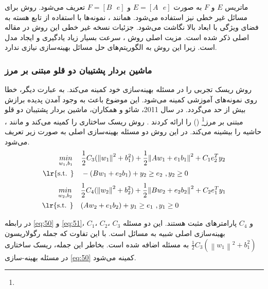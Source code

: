 ماتریس  $E$ و $F$  به صورت  $E=[A\text{ }e]$ و $F=[B\text{ }e]$ تعریف می‌شود.  روش  برای مسائل غیر خطی نیز استفاده می‌شود. همانند ، نمونه‌ها با استفاده از تابع هسته به فضای ویژگی با ابعاد بالا نگاشت می‌شود. جزئیات نسخه غیر خطی این روش در مقاله اصلی \cite{kumar2009} ذکر شده است. مزیت اصلی روش ، سرعت بسیار زیاد یادگیری و ایجاد مدل است. زیرا این روش به الگوریتم‌های حل مسائل بهینه‌سازی نیازی ندارد.

\subsubsection{ماشین بردار پشتیبان دو قلو مبتنی بر مرز}\label{sec:2:2:3:2}
روش  ریسک تجربی را در مسئله بهینه‌سازی خود کمینه می‌کند. به عبارت دیگر، خطا روی نمونه‌های آموزشی کمینه می‌شود. این موضوع باعث به وجود آمدن پدیده برازش بیش از حد می‌گردد. در سال 2011، شائو و همکاران، ماشین بردار پشتیبان دو قلو مبتنی بر مرز\footnote{}  () را ارائه کردند \cite{shao2011}. روش  ریسک ساختاری را کمینه می‌کند و مانند ، حاشیه را بیشینه می‌کند. در این روش دو مسئله بهینه‌سازی اصلی به صورت زیر تعریف می‌شود.
\begin{equation}
\begin{split}
   \underset{{{w}_{1}},{{b}_{1}}}{\mathop{min}}\,\quad  & \frac{1 }{2} C_{3} (\left\|w_{1}\right\|^{2}+b^{2}_{1}) + \frac{1}{2}{{\left\| A{{w}_{1}}+{{e}_{1}}{{b}_{1}} \right\|}^{2}}+{{C}_{1}}e_{2}^{T}{{y}_{2}}  \\
\textrm{\lr{s.t. }} \quad  & -(B{{w}_{1}}+{{e}_{2}}{{b}_{1}})+{{y}_{2}}\ge {{e}_{2}}\text{ },{{y}_{2}}\ge 0  \\
\end{split}
\label{eq:50}
\end{equation}
\begin{equation}
\begin{split}
\underset{{{w}_{2}},{{b}_{2}}}{\mathop{min}}\,\quad  & \frac{1 }{2} C_{4} (\left\|w_{2}\right\|^{2}+b^{2}_{2}) + \frac{1}{2}{{\left\| B{{w}_{2}}+{{e}_{2}}{{b}_{2}} \right\|}^{2}}+{{C}_{2}}e_{1}^{T}{{y}_{1}}  \\
\textrm{\lr{s.t. }} \quad  & (A{{w}_{2}}+{{e}_{1}}{{b}_{2}})+{{y}_{1}}\ge {{e}_{1}}\text{ },{{y}_{1}}\ge 0  \\
\end{split}
\label{eq:51}
\end{equation}

در رابطه \ref{eq:50} و \ref{eq:51}،  $C_1$،  $C_2$،  $C_3$ و  $C_4$ پارامترهای مثبت هستند. این دو مسئله بهینه‌سازی اصلی شبیه به مسائل  است. با این تفاوت که جمله رگولاریسون $\frac{1}{2}{{C}_{3}}({{\left\| {{w}_{1}} \right\|}^{2}}+b_{1}^{2})$ به مسئله اضافه شده است. بخاطر این جمله، ریسک ساختاری در مسئله بهینه-سازی \ref{eq:50} کمینه می‌شود.

